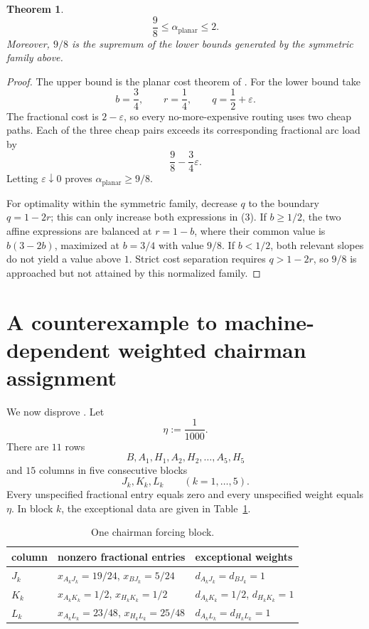 \documentclass[11pt]{article}
\newtheorem{theorem}{Theorem}[section]
\theoremstyle{definition}
\newcommand{\eps}{\varepsilon}
\begin{document}
\begin{theorem}\label{thm:nine-eighths}
\[
 \frac98\le \alpha_{\mathrm{planar}}\le2.
\]
Moreover, $9/8$ is the supremum of the lower bounds generated by the symmetric
family above.
\end{theorem}
\begin{proof}
The upper bound is the planar cost theorem of
\citet{TraubVargasKochZenklusen2024}.  For the lower bound take
\[
 b=\frac34,\qquad r=\frac14,\qquad q=\frac12+\eps.
\]
The fractional cost is $2-\eps$, so every no-more-expensive routing uses two
cheap paths.  Each of the three cheap pairs exceeds its corresponding
fractional arc load by
\[
 \frac98-\frac34\eps.
\]
Letting $\eps\downarrow0$ proves $\alpha_{\mathrm{planar}}\ge9/8$.

For optimality within the symmetric family, decrease $q$ to the boundary
$q=1-2r$; this can only increase both expressions in (3).  If $b\ge1/2$, the
two affine expressions are balanced at $r=1-b$, where their common value is
$b(3-2b)$, maximized at $b=3/4$ with value $9/8$.  If $b<1/2$, both relevant
slopes do not yield a value above $1$.  Strict cost separation requires
$q>1-2r$, so $9/8$ is approached but not attained by this normalized family.
\end{proof}

\section{A counterexample to machine-dependent weighted chairman assignment}

We now disprove \citet[Conjecture~19]{LiuReis2026}.  Let
\[
 \eta:=\frac1{1000}.
\]
There are $11$ rows
\[
 B,A_1,H_1,A_2,H_2,\dots,A_5,H_5
\]
and $15$ columns in five consecutive blocks
\[
 J_k,K_k,L_k\qquad(k=1,\dots,5).
\]
Every unspecified fractional entry equals zero and every unspecified weight
equals $\eta$.  In block $k$, the exceptional data are given in
Table~\ref{tab:chairman}.

\begin{table}[ht]
\centering
\caption{One chairman forcing block.}
\label{tab:chairman}
\begin{tabular}{@{}lll@{}}
\toprule
column & nonzero fractional entries & exceptional weights\\
\midrule
$J_k$ & $x_{A_kJ_k}=19/24$, $x_{BJ_k}=5/24$
      & $d_{A_kJ_k}=d_{BJ_k}=1$\\
$K_k$ & $x_{A_kK_k}=1/2$, $x_{H_kK_k}=1/2$
      & $d_{A_kK_k}=1/2$, $d_{H_kK_k}=1$\\
$L_k$ & $x_{A_kL_k}=23/48$, $x_{H_kL_k}=25/48$
      & $d_{A_kL_k}=d_{H_kL_k}=1$\\
\bottomrule
\end{tabular}
\end{table}
\end{document}
